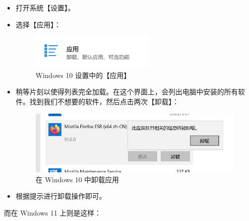 \begin{itemize}
  \item 打开系统【设置】。
  \item 选择【应用】：
    \begin{figure}[htb!]
      \centering
      \includegraphics[width=6cm]{assets/Win_10_Apps.png}
      \caption{Windows 10 设置中的【应用】}
      \label{Win_10_Apps}
    \end{figure}
  \item 稍等片刻以使得列表完全加载。在这个界面上，会列出电脑中安装的所有软件。找到我们不想要的软件，然后点击两次【卸载】：
    \begin{figure}[thb!]
      \centering
      \includegraphics[width=11cm]{assets/Win_10_Uninstall.png}
      \caption{在 Windows 10 中卸载应用}
      \label{Win_10_Uninstall}
    \end{figure}
  \item 根据提示进行卸载操作即可。
\end{itemize}

而在 Windows 11 上则是这样：

